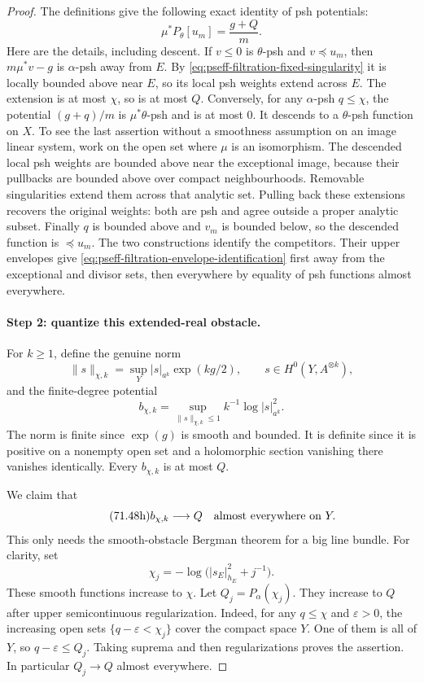 \begin{proof}
The definitions give the following exact identity of psh potentials:
\[
\tag{71.48g}\label{eq:pseff-filtration-envelope-identification}
                   \mu^*P_\theta[u_m]=\frac{g+Q}{m}.
\]
Here are the details, including descent.
If \(v\leq0\) is \(\theta\)-psh and \(v\preceq u_m\), then
\(m\mu^*v-g\) is \(\alpha\)-psh away from \(E\).
By \eqref{eq:pseff-filtration-fixed-singularity} it is locally bounded above near
\(E\), so its local psh weights extend across \(E\).
The extension is at most \(\chi\), so is at most \(Q\).
Conversely, for any \(\alpha\)-psh \(q\leq\chi\), the potential
\((g+q)/m\) is \(\mu^*\theta\)-psh and is at most \(0\).
It descends to a \(\theta\)-psh function on \(X\).
To see the last assertion without a smoothness assumption on an image
linear system, work on the open set where \(\mu\) is an isomorphism.
The descended local psh weights are bounded above near the exceptional
image, because their pullbacks are bounded above over compact
neighbourhoods.  Removable singularities extend them across that analytic
set.  Pulling back these extensions recovers the original weights:
both are psh and agree outside a proper analytic subset.
Finally \(q\) is bounded above and \(v_m\) is bounded below, so the
descended function is \(\preceq u_m\).
The two constructions identify the competitors.
Their upper envelopes give \eqref{eq:pseff-filtration-envelope-identification}
first away from the exceptional and divisor sets, then everywhere by
equality of psh functions almost everywhere.

\paragraph{Step 2: quantize this extended-real obstacle.}
For \(k\geq1\), define the genuine norm
\[
 \|s\|_{\chi,k}
   =\sup_Y |s|_{a^k}\exp(kg/2),\qquad s\in H^0(Y,A^{\otimes k}),
\]
and the finite-degree potential
\[
 b_{\chi,k}
  =\sup_{\|s\|_{\chi,k}\leq1}k^{-1}\log|s|_{a^k}^2.
\]
The norm is finite since \(\exp(g)\) is smooth and bounded.
It is definite since it is positive on a nonempty open set and a
holomorphic section vanishing there vanishes identically.
Every \(b_{\chi,k}\) is at most \(Q\).

We claim that
\[
\tag{71.48h}\label{eq:pseff-filtration-extended-obstacle-quantization}
                         b_{\chi,k}\longrightarrow Q
                  \quad\hbox{almost everywhere on }Y.
\]
This only needs the smooth-obstacle Bergman theorem for a big line bundle.
For clarity, set
\[
             \chi_j=-\log\bigl(|s_E|_{h_E}^2+j^{-1}\bigr).
\]
These smooth functions increase to \(\chi\).
Let \(Q_j=P_\alpha(\chi_j)\).
They increase to \(Q\) after upper semicontinuous regularization.
Indeed, for any \(q\leq\chi\) and \(\varepsilon>0\), the increasing open
sets
\(\{q-\varepsilon<\chi_j\}\) cover the compact space \(Y\).
One of them is all of \(Y\), so \(q-\varepsilon\leq Q_j\).
Taking suprema and then regularizations proves the assertion.
In particular \(Q_j\to Q\) almost everywhere.


\end{proof}
